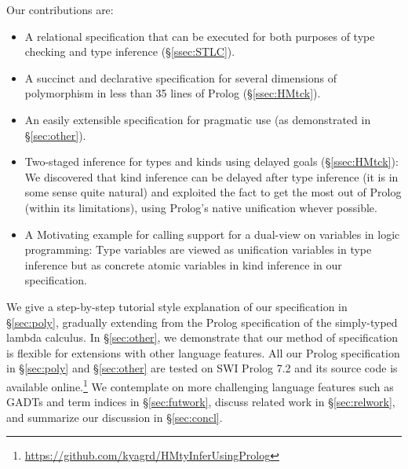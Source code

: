 Our contributions are:
\begin{itemize}\vspace*{-1ex}
\item A relational specification that can be executed for
	both purposes of type checking and type inference (\S\ref{ssec:STLC}).
\item A succinct and declarative specification for several dimensions of
	polymorphism in less than 35 lines of Prolog (\S\ref{ssec:HMtck}).
\item An easily extensible specification for pragmatic use
	(as demonstrated in \S\ref{sec:other}).
\item Two-staged inference for types and kinds using delayed goals
	(\S\ref{ssec:HMtck}):
We discovered that kind inference can be delayed after type inference
(it is in some sense quite natural) and exploited the fact to get the
most out of Prolog (within its limitations), using Prolog's
native unification whever possible.
\item A Motivating example for calling support for a dual-view
	on variables in logic programming:
Type variables are viewed as unification variables
in type inference but as concrete atomic variables
in kind inference in our specification.
\end{itemize}

We give a step-by-step tutorial style explanation of our specification in
\S\ref{sec:poly}, gradually extending from the Prolog specification of
the simply-typed lambda calculus. In \S\ref{sec:other}, we demonstrate
that our method of specification is flexible for extensions with
other language features. All our Prolog specification in \S\ref{sec:poly}
and \S\ref{sec:other} are tested on SWI Prolog 7.2 and its source code is
available online.\footnote{
	\url{https://github.com/kyagrd/HMtyInferUsingProlog} }
We contemplate on more challenging language features such as GADTs and
term indices in \S\ref{sec:futwork}, discuss related work in
\S\ref{sec:relwork}, and summarize our discussion in \S\ref{sec:concl}.




